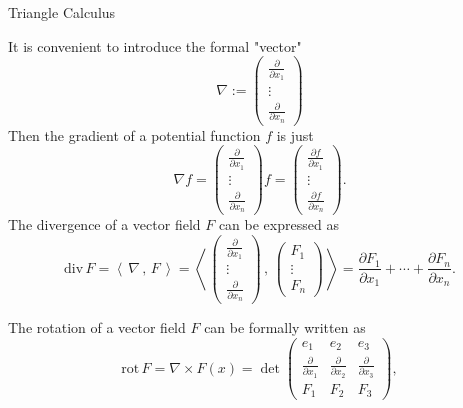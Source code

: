 \documentclass[smaller,hyperref={CJKbookmarks=true}]{beamer}
\newcommand{\scp}[2]{\left\langle\,#1\,,\,#2\,\right\rangle} \newcommand{\scpp}{\langle\,\cdot\,,\,\cdot\,\rangle}
\begin{document}
\begin{frame}{Triangle Calculus}
\begin{spacing}{0.8}
It is convenient to introduce the formal "vector"
\[\nabla:=\begin{pmatrix}
            \frac{\partial}{\partial x_1} \\
            \vdots \\
            \frac{\partial}{\partial x_n}
          \end{pmatrix}\]
Then the gradient of a potential function $f$ is just
\[\nabla f=\begin{pmatrix}
            \frac{\partial}{\partial x_1} \\
            \vdots \\
            \frac{\partial}{\partial x_n}
          \end{pmatrix}f=\begin{pmatrix}
            \frac{\partial f}{\partial x_1} \\
            \vdots \\
            \frac{\partial f}{\partial x_n}
          \end{pmatrix}.\]
The divergence of a vector field $F$ can be expressed as
\[\text{div}\,F=\scp{\nabla}{F}=\scp{\begin{pmatrix}
            \frac{\partial}{\partial x_1} \\
            \vdots \\
            \frac{\partial}{\partial x_n}
          \end{pmatrix}}{\begin{pmatrix}
                           F_1 \\
                           \vdots \\
                           F_n
                         \end{pmatrix}}=\frac{\partial F_1}{\partial x_1}+\cdots+\frac{\partial F_n}{\partial x_n}.\]
\end{spacing}
\newpage
\begin{spacing}{1.1}
The rotation of a vector field $F$ can be formally written as
\[\text{rot}\,F=\nabla\times F(x)
=\det\begin{pmatrix}
       e_1 & e_2 & e_3 \\[3pt]
       \frac{\partial}{\partial x_1} & \frac{\partial}{\partial x_2} & \frac{\partial}{\partial x_3} \\[3pt]
       F_1 & F_2 & F_3
     \end{pmatrix},\]

\end{spacing}
\end{frame}
\end{document}
